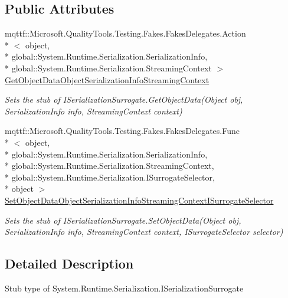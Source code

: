 \subsection*{Public Attributes}
\begin{DoxyCompactItemize}
\item 
mqttf\-::\-Microsoft.\-Quality\-Tools.\-Testing.\-Fakes.\-Fakes\-Delegates.\-Action\\*
$<$ object, \\*
global\-::\-System.\-Runtime.\-Serialization.\-Serialization\-Info, \\*
global\-::\-System.\-Runtime.\-Serialization.\-Streaming\-Context $>$ \hyperlink{class_system_1_1_runtime_1_1_serialization_1_1_fakes_1_1_stub_i_serialization_surrogate_a2b538daf3631cbdfd38369b89b0d313e}{Get\-Object\-Data\-Object\-Serialization\-Info\-Streaming\-Context}
\begin{DoxyCompactList}\small\item\em Sets the stub of I\-Serialization\-Surrogate.\-Get\-Object\-Data(\-Object obj, Serialization\-Info info, Streaming\-Context context)\end{DoxyCompactList}\item 
mqttf\-::\-Microsoft.\-Quality\-Tools.\-Testing.\-Fakes.\-Fakes\-Delegates.\-Func\\*
$<$ object, \\*
global\-::\-System.\-Runtime.\-Serialization.\-Serialization\-Info, \\*
global\-::\-System.\-Runtime.\-Serialization.\-Streaming\-Context, \\*
global\-::\-System.\-Runtime.\-Serialization.\-I\-Surrogate\-Selector, \\*
object $>$ \hyperlink{class_system_1_1_runtime_1_1_serialization_1_1_fakes_1_1_stub_i_serialization_surrogate_a5c2814104bf43f5e8b04a9c125d63ebf}{Set\-Object\-Data\-Object\-Serialization\-Info\-Streaming\-Context\-I\-Surrogate\-Selector}
\begin{DoxyCompactList}\small\item\em Sets the stub of I\-Serialization\-Surrogate.\-Set\-Object\-Data(\-Object obj, Serialization\-Info info, Streaming\-Context context, I\-Surrogate\-Selector selector)\end{DoxyCompactList}\end{DoxyCompactItemize}


\subsection{Detailed Description}
Stub type of System.\-Runtime.\-Serialization.\-I\-Serialization\-Surrogate



